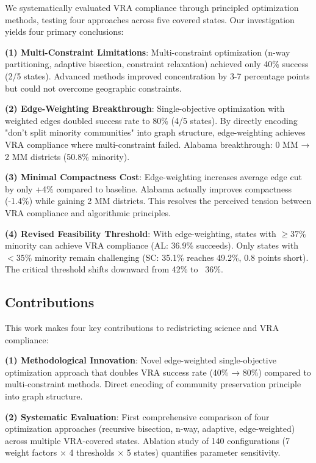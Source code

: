 We systematically evaluated VRA compliance through principled optimization methods, testing four approaches across five covered states. Our investigation yields four primary conclusions:

\textbf{(1) Multi-Constraint Limitations}: Multi-constraint optimization (n-way partitioning, adaptive bisection, constraint relaxation) achieved only 40\% success (2/5 states). Advanced methods improved concentration by 3-7 percentage points but could not overcome geographic constraints.

\textbf{(2) Edge-Weighting Breakthrough}: Single-objective optimization with weighted edges doubled success rate to 80\% (4/5 states). By directly encoding "don't split minority communities" into graph structure, edge-weighting achieves VRA compliance where multi-constraint failed. Alabama breakthrough: 0 MM → 2 MM districts (50.8\% minority).

\textbf{(3) Minimal Compactness Cost}: Edge-weighting increases average edge cut by only +4\% compared to baseline. Alabama actually improves compactness (-1.4\%) while gaining 2 MM districts. This resolves the perceived tension between VRA compliance and algorithmic principles.

\textbf{(4) Revised Feasibility Threshold}: With edge-weighting, states with $\geq 37\%$ minority can achieve VRA compliance (AL: 36.9\% succeeds). Only states with $<35\%$ minority remain challenging (SC: 35.1\% reaches 49.2\%, 0.8 points short). The critical threshold shifts downward from 42\% to ~36\%.

\subsection{Contributions}

This work makes four key contributions to redistricting science and VRA compliance:

\textbf{(1) Methodological Innovation}: Novel edge-weighted single-objective optimization approach that doubles VRA success rate (40\% → 80\%) compared to multi-constraint methods. Direct encoding of community preservation principle into graph structure.

\textbf{(2) Systematic Evaluation}: First comprehensive comparison of four optimization approaches (recursive bisection, n-way, adaptive, edge-weighted) across multiple VRA-covered states. Ablation study of 140 configurations (7 weight factors × 4 thresholds × 5 states) quantifies parameter sensitivity.

